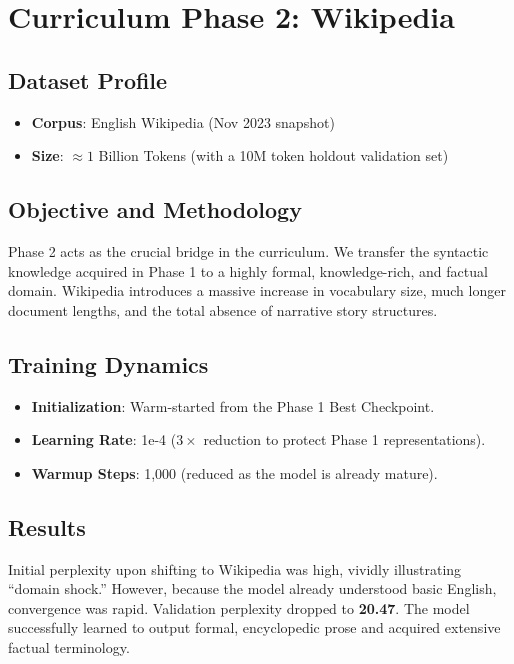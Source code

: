 \documentclass[12pt]{article}
\begin{document}
\section{Curriculum Phase 2: Wikipedia}
\subsection{Dataset Profile}
\begin{itemize}
    \item \textbf{Corpus}: English Wikipedia (Nov 2023 snapshot)
    \item \textbf{Size}: $\approx 1$ Billion Tokens (with a 10M token holdout validation set)
\end{itemize}

\subsection{Objective and Methodology}
Phase 2 acts as the crucial bridge in the curriculum. We transfer the syntactic knowledge acquired in Phase 1 to a highly formal, knowledge-rich, and factual domain. Wikipedia introduces a massive increase in vocabulary size, much longer document lengths, and the total absence of narrative story structures.

\subsection{Training Dynamics}
\begin{itemize}
    \item \textbf{Initialization}: Warm-started from the Phase 1 Best Checkpoint.
    \item \textbf{Learning Rate}: 1e-4 ($3\times$ reduction to protect Phase 1 representations).
    \item \textbf{Warmup Steps}: 1,000 (reduced as the model is already mature).
\end{itemize}

\subsection{Results}
Initial perplexity upon shifting to Wikipedia was high, vividly illustrating ``domain shock.'' However, because the model already understood basic English, convergence was rapid. Validation perplexity dropped to \textbf{20.47}. The model successfully learned to output formal, encyclopedic prose and acquired extensive factual terminology.
\end{document}
